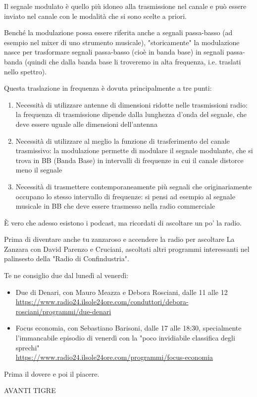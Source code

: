 Il segnale modulato è quello più idoneo alla trasmissione nel canale e può essere inviato nel canale con le modalità che si sono scelte a priori. \newline

Benché la modulazione possa essere riferita anche a segnali passa-basso (ad esempio nel mixer di uno strumento musicale), 
"storicamente" la modulazione nasce per trasformare segnali passa-basso (cioè in banda base) in segnali passa-banda (quindi che dalla banda base li troveremo in alta frequenza, i.e. traslati nello spettro). \newline 

Questa traslazione in frequenza è dovuta principalmente a tre punti: 

\begin{enumerate}
    \item Necessità di utilizzare antenne di dimensioni ridotte nelle trasmissioni radio: la frequenza di trasmissione dipende dalla lunghezza d'onda del segnale, che deve essere uguale alle dimensioni dell'antenna 
    \item Necessità di utilizzare al meglio la funzione di trasferimento del canale trasmissivo: la modulazione permette di modulare il segnale modulante, che si trova in BB (Banda Base) in intervalli di frequenze in cui il canale distorce meno il segnale 
    \item Necessità di trasmettere contemporaneamente più segnali che originariamente occupano lo stesso intervallo di frequenze: si pensi ad esempio al segnale musicale in BB che deve essere trasmesso nella radio commerciale 
\end{enumerate}

\begin{tcolorbox}
    È vero che adesso esistono i podcast, ma ricordati di ascoltare un po' la radio. \newline 

    Prima di diventare anche tu zanzaroso e accendere la radio per ascoltare La Zanzara con David Parenzo e Cruciani, 
    ascoltati altri programmi interessanti nel palinsesto della "Radio di Confindustria". \newline 
    
    Te ne consiglio due dal lunedì al venerdì: 
    \begin{itemize}
        \item Due di Denari, con Mauro Meazza e Debora Rosciani, dalle 11 alle 12 \\ \url{https://www.radio24.ilsole24ore.com/conduttori/debora-rosciani/programmi/due-denari} 
        \item Focus economia, con Sebastiano Barisoni, dalle 17 alle 18:30, specialmente l'immancabile episodio di venerdì con la "poco invidiabile classifica degli sprechi" \\ \url{https://www.radio24.ilsole24ore.com/programmi/focus-economia} 
    \end{itemize}

    Prima il dovere e poi il piacere. \newline 

    AVANTI TIGRE
\end{tcolorbox}

